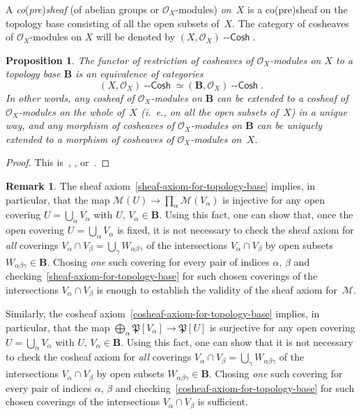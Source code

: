\documentclass[12pt,a4paper]{amsart}
\newcommand{\+}{\nobreakdash-}
\renewcommand{\:}{\colon}
\newcommand{\rarrow}{\longrightarrow}
\newcommand{\Cosh}{{\operatorname{\mathsf{--Cosh}}}}
\newcommand{\bB}{\mathbf B}
\newcommand{\cO}{\mathcal O}
\newcommand{\cM}{\mathcal M}
\newcommand{\fP}{\mathfrak P}
\theoremstyle{plain}
\newtheorem{prop}[thm]{Proposition}
\theoremstyle{definition}
\newtheorem{rem}[thm]{Remark}
\begin{document}
 A \emph{co}(\emph{pre})\emph{sheaf} (of abelian groups or
$\cO_X$\+modules) \emph{on~$X$} is a co(pre)sheaf on the topology base
consisting of all the open subsets of~$X$.
 The category of cosheaves of $\cO_X$\+modules on $X$ will be denoted
by $(X,\cO_X)\Cosh$.

\begin{prop} \label{cosheaves-determined-on-topology-base}
 The functor of restriction of cosheaves of\/ $\cO_X$\+modules on $X$
to a topology base\/ $\bB$ is an equivalence of categories
$$
 (X,\cO_X)\Cosh\simeq(\bB,\cO_X)\Cosh.
$$
 In other words, any cosheaf of\/ $\cO_X$\+modules on\/ $\bB$ can be
extended to a cosheaf of\/ $\cO_X$\+modules on the whole of~$X$ (i.~e.,
on all the open subsets of~$X$) in a unique way, and any morphism of
cosheaves of\/ $\cO_X$\+modules on\/ $\bB$ can be uniquely extended
to a morphism of cosheaves of\/ $\cO_X$\+modules on~$X$.
\end{prop}

\begin{proof}
 This is~\cite[Theorem~2.1.2]{Pcosh}, \cite[Theorem~2.1(b)]{Pdomc},
or~\cite[Section~3.2]{Pform}.
\end{proof}

\begin{rem} \label{one-covering-of-the-intersections-is-enough}
 The sheaf axiom~\eqref{sheaf-axiom-for-topology-base} implies, in
particular, that the map $\cM(U)\rarrow\prod_\alpha\cM(V_\alpha)$
is injective for any open covering $U=\bigcup_\alpha V_\alpha$ with
$U$, $V_\alpha\in\bB$.
 Using this fact, one can show that, once the open covering
$U=\bigcup_\alpha V_\alpha$ is fixed, it is not necessary to check
 the sheaf axiom for \emph{all} coverings $V_\alpha\cap V_\beta=
\bigcup_\gamma W_{\alpha\beta\gamma}$ of the intersections
$V_\alpha\cap V_\beta$ by open subsets $W_{\alpha\beta\gamma}\in\bB$.
 Chosing \emph{one} such covering for every pair of indices $\alpha$,
$\beta$ and checking~\eqref{sheaf-axiom-for-topology-base} for such
chosen coverings of the intersections $V_\alpha\cap V_\beta$ is
enough to establish the validity of the sheaf axiom for~$\cM$.

 Similarly, the cosheaf axiom~\eqref{cosheaf-axiom-for-topology-base}
implies, in particular, that the map $\bigoplus_\alpha\fP[V_\alpha]
\rarrow\fP[U]$ is surjective for any open covering
$U=\bigcup_\alpha V_\alpha$ with $U$, $V_\alpha\in\bB$.
 Using this fact, one can show that it is not necessary to check
the cosheaf axiom for \emph{all} coverings $V_\alpha\cap V_\beta=
\bigcup_\gamma W_{\alpha\beta\gamma}$ of the intersections
$V_\alpha\cap V_\beta$ by open subsets $W_{\alpha\beta\gamma}\in\bB$.
 Chosing \emph{one} such covering for every pair of indices $\alpha$,
$\beta$ and checking~\eqref{cosheaf-axiom-for-topology-base} for such
chosen coverings of the intersections $V_\alpha\cap V_\beta$ is
sufficient.
\end{rem}
\end{document}
